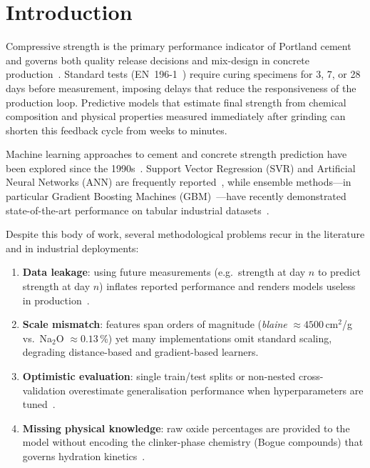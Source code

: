\documentclass[preprint,12pt]{elsarticle}
\begin{document}
\linenumbers

\section{Introduction}
\label{sec:introduction}

Compressive strength is the primary performance indicator of Portland cement
and governs both quality release decisions and mix-design in concrete
production~\cite{neville2011}.
Standard tests (EN~196-1~\cite{en196}) require curing specimens for 3, 7, or 28
days before measurement, imposing delays that reduce the responsiveness of the
production loop.
Predictive models that estimate final strength from chemical composition and
physical properties measured immediately after grinding can shorten this
feedback cycle from weeks to minutes.

Machine learning approaches to cement and concrete strength prediction have been
explored since the 1990s~\cite{topcu_blaine}.
Support Vector Regression (SVR) and Artificial Neural Networks (ANN) are
frequently reported~\cite{svr_cement,topcu_blaine}, while ensemble methods---in
particular Gradient Boosting Machines (GBM)~\cite{gbm_friedman2001}---have
recently demonstrated state-of-the-art performance on tabular industrial
datasets~\cite{cement_gbm_oey,young2019}.

Despite this body of work, several methodological problems recur in the
literature and in industrial deployments:

\begin{enumerate}
  \item \textbf{Data leakage}: using future measurements (e.g.\ strength at day
        $n$ to predict strength at day $n$) inflates reported performance and
        renders models useless in production~\cite{nested_cv}.
  \item \textbf{Scale mismatch}: features span orders of magnitude
        (\textit{blaine} $\approx 4500$\,cm$^2$/g vs.\
        Na$_2$O $\approx 0.13$\,\%) yet many implementations omit standard
        scaling, degrading distance-based and gradient-based learners.
  \item \textbf{Optimistic evaluation}: single train/test splits or non-nested
        cross-validation overestimate generalisation performance when
        hyperparameters are tuned~\cite{nested_cv}.
  \item \textbf{Missing physical knowledge}: raw oxide percentages are provided
        to the model without encoding the clinker-phase chemistry (Bogue
        compounds) that governs hydration kinetics~\cite{taylor1997}.
\end{enumerate}
\end{document}
